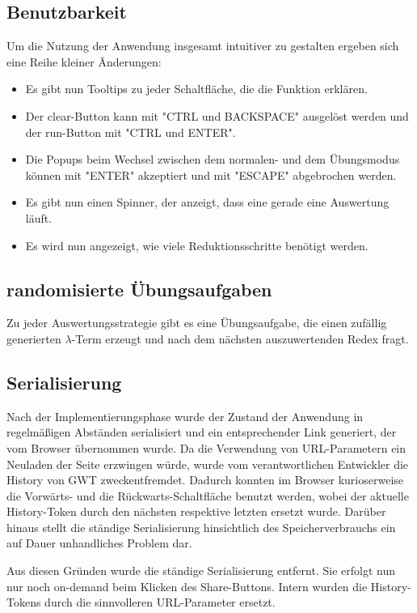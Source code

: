 \documentclass[parskip=full,11pt,openany]{scrreprt}
\begin{document}
\subsection{Benutzbarkeit}
Um die Nutzung der Anwendung insgesamt intuitiver zu gestalten ergeben sich eine Reihe kleiner Änderungen:

\begin{itemize}
\item Es gibt nun Tooltips zu jeder Schaltfläche, die die Funktion erklären.
\item Der clear-Button kann mit "CTRL und BACKSPACE" ausgelöst werden und der run-Button mit "CTRL und ENTER".
\item Die Popups beim Wechsel zwischen dem normalen- und dem Übungsmodus können mit "ENTER" akzeptiert und mit
"ESCAPE" abgebrochen werden.
\item Es gibt nun einen Spinner, der anzeigt, dass eine gerade eine Auswertung läuft.
\item Es wird nun angezeigt, wie viele Reduktionsschritte benötigt werden.
\end{itemize}

\subsection{randomisierte Übungsaufgaben}
Zu jeder Auswertungsstrategie gibt es eine Übungsaufgabe, die einen zufällig generierten $\lambda$-Term erzeugt
und nach dem nächsten auszuwertenden Redex fragt.

\subsection{Serialisierung}
Nach der Implementierungsphase wurde der Zustand der Anwendung in regelmäßigen Abständen serialisiert und 
ein entsprechender Link generiert, der vom Browser übernommen wurde.
Da die Verwendung von URL-Parametern ein Neuladen der Seite erzwingen würde, wurde vom verantwortlichen 
Entwickler die History von GWT zweckentfremdet.
Dadurch konnten im Browser kurioserweise die Vorwärts- und die Rückwarts-Schaltfläche benutzt werden, wobei
der aktuelle History-Token durch den nächsten respektive letzten ersetzt wurde.
Darüber hinaus stellt die ständige Serialisierung hinsichtlich des Speicherverbrauchs ein auf Dauer unhandliches
Problem dar.

Aus diesen Gründen wurde die ständige Serialisierung entfernt. Sie erfolgt nun nur noch on-demand beim Klicken
des Share-Buttons. Intern wurden die History-Tokens durch die sinnvolleren URL-Parameter ersetzt.
\end{document}
